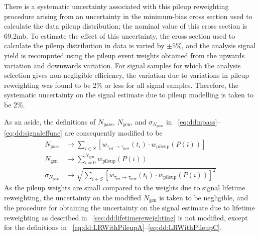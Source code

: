 There is a systematic uncertainty associated with this pileup reweighting procedure arising from an uncertainty in the minimum-bias \pp cross section used to calculate the data pileup distribution; the nominal value of this cross section is 69.2\unit{mb}.
To estimate the effect of this uncertainty, the \pp cross section used to calculate the pileup distribution in data is varied by $\pm 5\%$, and the analysis signal yield is recomputed using the pileup event weights obtained from the upwards variation and downwards variation.
For signal samples for which the analysis selection gives non-negligible efficiency, the variation due to variations in pileup reweighting was found to be 2\% or less for all signal samples.
Therefore, the systematic uncertainty on the signal estimate due to pileup modelling is taken to be 2\%.

As an aside, the definitions of $N_\text{pass}$, $N_\text{gen}$, and $\sigma_{N_\text{pass}}$ in \Eqs~\ref{eq:dd:npass}--\ref{eq:dd:signaleffunc} are consequently modified to be
\begin{align}
  \label{eq:dd:LRWithPileupA}
  N_\text{pass}          &\to \sum_{i\in S}{\left[w_{\tau_\text{ref}\to\tau_\text{new}}(t_i) \cdot w_\text{pileup}(P(i))\right]} \\
  \label{eq:dd:LRWithPileupB}
  N_\text{gen}           &\to \sum_{i = 0}^{N_\text{gen}}{w_\text{pileup}(P(i))} \\
  \label{eq:dd:LRWithPileupC}
  \sigma_{N_\text{pass}} &\to \sqrt{\sum_{i\in S}{\left[w_{\tau_\text{ref}\to\tau_\text{new}}(t_i) \cdot w_\text{pileup}(P(i))\right]^2}}
\end{align}
As the pileup weights are small compared to the weights due to signal lifetime reweighting, the uncertainty on the modified $N_\text{gen}$ is taken to be negligible, and the procedure for obtaining the uncertainty on the signal estimate due to lifetime reweighting as described in \Sec~\ref{sec:dd:lifetimereweighting} is not modified, except for the definitions in \Eqs~\ref{eq:dd:LRWithPileupA}--\ref{eq:dd:LRWithPileupC}.

